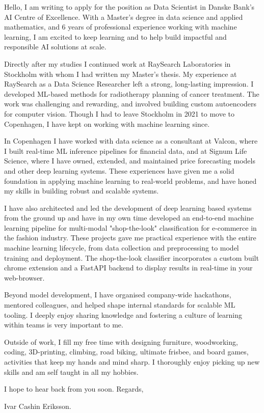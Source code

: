 \documentclass[11pt,a4paper]{moderncv}
\begin{document}
\makecvtitle
Hello, I am writing to apply for the position as Data Scientist in Danske Bank's AI Centre of Excellence. With a Master's degree in data science and applied mathematics, and 6 years of professional experience working with machine learning, I am excited to keep learning and to help build impactful and responsible AI solutions at scale.

\hspace*{2em}
Directly after my studies I continued work at RaySearch Laboratories in Stockholm with whom I had written my Master's thesis. My experience at RaySearch as a Data Science Researcher left a strong, long-lasting impression. I developed ML-based methods for radiotherapy planning of cancer treatment. The work was challenging and rewarding, and involved building custom autoencoders for computer vision. Though I had to leave Stockholm in 2021 to move to Copenhagen, I have kept on working with machine learning since.

\hspace*{2em}
In Copenhagen I have worked with data science as a consultant at Valcon, where I built real-time ML inference pipelines for financial data, and at Signum Life Science, where I have owned, extended, and maintained price forecasting models and other deep learning systems. These experiences have given me a solid foundation in applying machine learning to real-world problems, and have honed my skills in building robust and scalable systems.

\hspace*{2em}
I have also architected and led the development of deep learning based systems from the ground up and have in my own time developed an end-to-end machine learning pipeline for multi-modal "shop-the-look" classification for e-commerce in the fashion industry. These projects gave me practical experience with the entire machine learning lifecycle, from data collection and preprocessing to model training and deployment. The shop-the-look classifier incorporates a custom built chrome extension and a FastAPI backend to display results in real-time in your web-browser.

\hspace*{2em}
Beyond model development, I have organised company-wide hackathons, mentored colleagues, and helped shape internal standards for scalable ML tooling. I deeply enjoy sharing knowledge and fostering a culture of learning within teams is very important to me.

\hspace*{2em}
Outside of work, I fill my free time with designing furniture, woodworking, coding, 3D-printing, climbing, road biking, ultimate frisbee, and board games, activities that keep my hands and mind sharp. I thoroughly enjoy picking up new skills and am self taught in all my hobbies.

\vspace{8 mm}
I hope to hear back from you soon. Regards, 

\vspace{3 mm} 
Ivar Cashin Eriksson.
\end{document}

